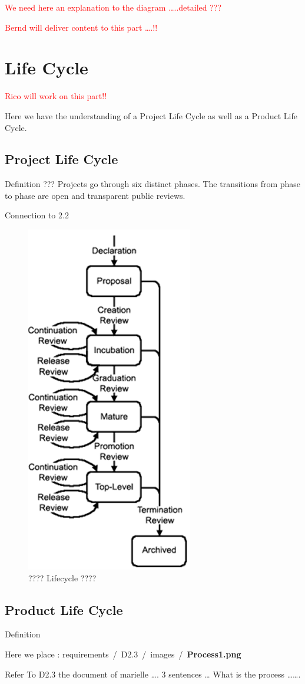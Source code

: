 \documentclass{template/openetcs_article}
\begin{document}
\textcolor{red}{We need here an explanation to the diagram {\dots}..detailed ???} 

\textcolor{red}{Bernd will deliver content to this part {\dots}.!! }


\section{Life Cycle}
\textcolor{red}{Rico will work on this part!!}

Here we have the understanding of a Project Life Cycle  as well as a Product Life Cycle.

\subsection{Project Life Cycle }
Definition ??? Projects go through six distinct phases. The transitions from phase to phase are open and transparent public reviews.

Connection to 2.2

\begin{figure}
\center
\includegraphics[width=.35\textwidth]{./figures/lifecycle.PNG}
\caption{???? Lifecycle ????}
\end{figure}

\subsection{Product Life Cycle }
Definition 

Here we place : requirements~/~D2.3~/~images~/~\textbf{Process1.png}

Refer To D2.3  the document of marielle  {\dots}. 3  sentences {\dots}  What is the process {\dots}{\dots}.
\end{document}

